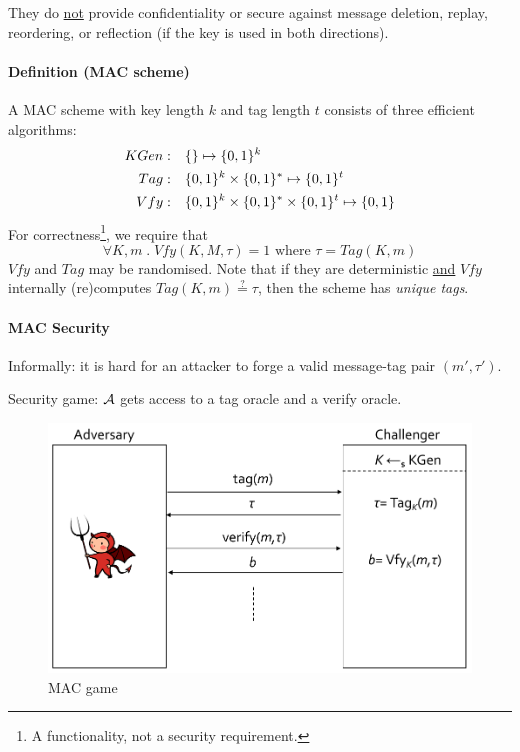 They do \underline{not} provide confidentiality or secure against message deletion, replay, reordering, or reflection (if the key is used in both directions).

\paragraph{Definition (MAC scheme)}
A MAC scheme with key length $k$ and tag length $t$ consists of three efficient algorithms:
\begin{align*}
KGen:& \quad \{\} \mapsto \lbrace 0, 1 \rbrace^k \\
Tag:& \quad \lbrace 0, 1 \rbrace^k \times \lbrace 0, 1 \rbrace^* \mapsto \lbrace 0, 1 \rbrace^t \\
Vfy:& \quad \lbrace 0, 1 \rbrace^k \times \lbrace 0, 1 \rbrace^* \times \lbrace 0, 1 \rbrace^t \mapsto \lbrace 0, 1 \rbrace
\end{align*}
For correctness\footnote{A functionality, not a security requirement.}, we require that
$$
\forall K, m \; . \; Vfy(K, M, \tau) = 1 \text{ where } \tau = Tag(K,m)
$$
$Vfy$ and $Tag$ may be randomised.
Note that if they are deterministic \underline{and} $Vfy$ internally (re)computes $Tag(K, m) \overset{?}{=} \tau$, then the scheme has \emph{unique tags}.

\paragraph{MAC Security}
Informally: it is hard for an attacker to forge a valid message-tag pair $(m', \tau')$.

Security game: $\mathcal{A}$ gets access to a tag oracle and a verify oracle.

\begin{figure}[h]
    \centering
	\includegraphics[scale=0.35]{images/mac.png}
    \caption{MAC game}
    \label{fig:mac}
\end{figure}

